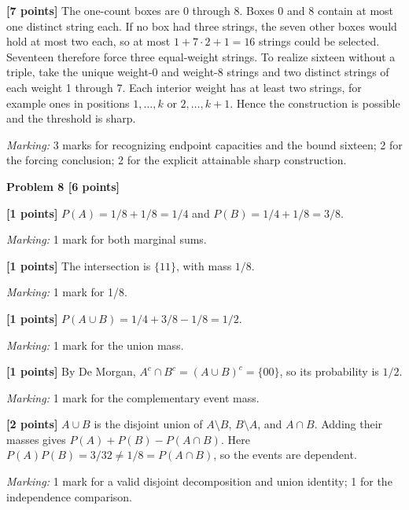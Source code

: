 \documentclass[12pt,letterpaper]{article}
\newcommand{\problemheading}[2][5\baselineskip]{\Needspace{#1}\par\noindent\hspace*{-0.625in}\textbf{#2}\par\nobreak\vspace{0.3em}}
\begin{document}
\begin{description}[font=\normalfont,leftmargin=1.2em,labelsep=0.4em]
\item[] \textbf{[7 points]} The one-count boxes are 0 through 8. Boxes 0 and 8 contain at most one distinct string each. If no box had three strings, the seven other boxes would hold at most two each, so at most $1+7\cdot2+1=16$ strings could be selected. Seventeen therefore force three equal-weight strings. To realize sixteen without a triple, take the unique weight-0 and weight-8 strings and two distinct strings of each weight 1 through 7. Each interior weight has at least two strings, for example ones in positions $1,\ldots,k$ or $2,\ldots,k+1$. Hence the construction is possible and the threshold is sharp.
\par\textit{Marking:} 3 marks for recognizing endpoint capacities and the bound sixteen; 2 for the forcing conclusion; 2 for the explicit attainable sharp construction.
\end{description}
\vspace{0.65em}
\problemheading[\dimexpr 3\baselineskip+4\baselineskip\relax]{Problem 8 [6 points]}
\begin{description}[font=\normalfont,leftmargin=1.2em,labelsep=0.4em]
\item[(a)] \textbf{[1 points]} $P(A)=1/8+1/8=1/4$ and $P(B)=1/4+1/8=3/8$.
\par\textit{Marking:} 1 mark for both marginal sums.
\item[(b)] \textbf{[1 points]} The intersection is $\{11\}$, with mass $1/8$.
\par\textit{Marking:} 1 mark for 1/8.
\item[(c)] \textbf{[1 points]} $P(A\cup B)=1/4+3/8-1/8=1/2$.
\par\textit{Marking:} 1 mark for the union mass.
\item[(d)] \textbf{[1 points]} By De Morgan, $A^c\cap B^c=(A\cup B)^c=\{00\}$, so its probability is $1/2$.
\par\textit{Marking:} 1 mark for the complementary event mass.
\item[(e)] \textbf{[2 points]} $A\cup B$ is the disjoint union of $A\setminus B$, $B\setminus A$, and $A\cap B$. Adding their masses gives $P(A)+P(B)-P(A\cap B)$. Here $P(A)P(B)=3/32\ne1/8=P(A\cap B)$, so the events are dependent.
\par\textit{Marking:} 1 mark for a valid disjoint decomposition and union identity; 1 for the independence comparison.
\end{description}
\end{document}
